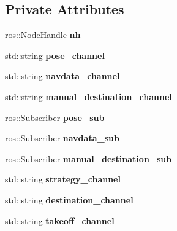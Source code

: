 \subsection*{Private Attributes}
\begin{DoxyCompactItemize}
\item 
\mbox{\label{classStrategy_a84206e2d0226fee2b494250e1e58ea60}} 
ros\+::\+Node\+Handle {\bfseries nh}
\item 
\mbox{\label{classStrategy_a2a127443a2dd78c711393f7d66caa6df}} 
std\+::string {\bfseries pose\+\_\+channel}
\item 
\mbox{\label{classStrategy_a4e1a388cee6f0a4bdc2a2af3e83702a3}} 
std\+::string {\bfseries navdata\+\_\+channel}
\item 
\mbox{\label{classStrategy_ae6623e185a70d5337a12adbc4b05702d}} 
std\+::string {\bfseries manual\+\_\+destination\+\_\+channel}
\item 
\mbox{\label{classStrategy_a22dc47841221dd2fff9d7030c4b7ea28}} 
ros\+::\+Subscriber {\bfseries pose\+\_\+sub}
\item 
\mbox{\label{classStrategy_a9b80202b4db9330834c76a3755399da4}} 
ros\+::\+Subscriber {\bfseries navdata\+\_\+sub}
\item 
\mbox{\label{classStrategy_a019f76ac00aa5a037d082ebb6bae951c}} 
ros\+::\+Subscriber {\bfseries manual\+\_\+destination\+\_\+sub}
\item 
\mbox{\label{classStrategy_ae502f048ed40a7d2eef49da6c3e85182}} 
std\+::string {\bfseries strategy\+\_\+channel}
\item 
\mbox{\label{classStrategy_af37ba1f383c46b7b9a596d052372d2e4}} 
std\+::string {\bfseries destination\+\_\+channel}
\item 
\mbox{\label{classStrategy_a7bbc0b7a0b3348d398856db9da4a86ff}} 
std\+::string {\bfseries takeoff\+\_\+channel}
\item 
\mbox{\label{classStrategy_a311bb1b7be560a42a6e2ef325fbeab39}} 

\end{DoxyCompactItemize}

